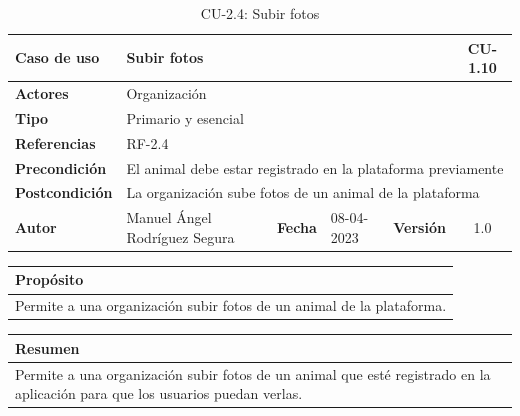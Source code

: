 \begin{table}[H]
    \begin{center}
        \begin{adjustbox}{width=\textwidth}
            \begin{tabular}{ | l | l | l | l | c | c | }
                \hline
                \textbf{Caso de uso} & \multicolumn{4}{l|}{Subir fotos} & \cellcolor{gray!50} \textbf{CU-1.10}\\
                \hline
                \textbf{Actores} & \multicolumn{5}{p{0.5\linewidth}|}{Organización} \\
                \hline
                \textbf{Tipo} & \multicolumn{5}{l|}{Primario y esencial} \\
                \hline
                \textbf{Referencias} & \multicolumn{3}{l|}{RF-2.4} & \multicolumn{2}{l|}{ }\\
                \hline
                \textbf{Precondición} & \multicolumn{5}{l|}{El animal debe estar registrado en la plataforma previamente} \\
                \hline
                \textbf{Postcondición} & \multicolumn{5}{l|}{La organización sube fotos de un animal de la plataforma} \\
                \hline
                \textbf{Autor} & \multicolumn{1}{p{0.25\linewidth}|}{Manuel Ángel Rodríguez Segura} & \textbf{Fecha} &
                08-04-2023     & \textbf{Versión}                                                      & 1.0\\
                \hline
            \end{tabular}
        \end{adjustbox}
        \caption{CU-2.4: Subir fotos}
        \label{tab:subir-fotos}
    \end{center}
\end{table}

\begin{table}[H]
    \centering
    \begin{tabularx}{\textwidth}{@{} |L |@{}} \hline
        \textbf{Propósito} \\
        \hline
        Permite a una organización subir fotos de un animal de la plataforma. \\
        \hline
    \end{tabularx}
\end{table}

\begin{table}[H]
    \centering
    \begin{tabularx}{\textwidth}{@{} |L |@{}} \hline
        \textbf{Resumen} \\
        \hline
        Permite a una organización subir fotos de un animal que esté registrado en la aplicación para que
    los usuarios puedan verlas. \\
        \hline
    \end{tabularx}
\end{table}


